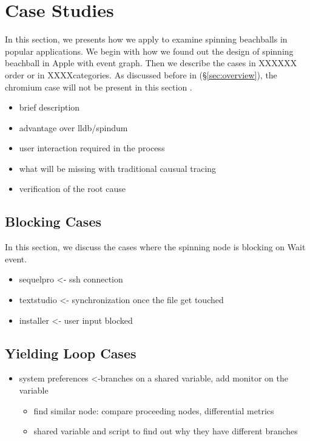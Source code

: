 \section{Case Studies}\label{sec:casestudy}

In this section, we presents how we apply \xxx to examine spinning
beachballs in \nbug popular applications. We begin with how we found out the
design of spinning beachball in Apple with event graph. Then we describe
the cases in XXXXXX order or in XXXXcategories. As discussed before in
(\S\ref{sec:overview}), the chromium case will not be present in this section .



\vspace{1cm}
\begin{itemize}
\item{brief description}
\item{advantage over lldb/spindum}
\item{user interaction required in the process}
\item{what will be missing with traditional causual tracing}
\item{verification of the root cause}
\end{itemize}

\subsection{Blocking Cases}
In this section, we discuss the cases where the spinning node is blocking on Wait event.
\begin{itemize}
\item sequelpro <- ssh connection
\item textstudio <- synchronization once the file get touched %
\item installer <- user input blocked
\end{itemize}


\subsection{Yielding Loop Cases}
\begin{itemize}
\item system preferences <-branches on a shared variable, add monitor on the variable
	\begin{itemize}
		\item find similar node: compare proceeding nodes, differential metrics
		\item shared variable and script to find out why they have different branches
	\end{itemize}
\end{itemize}

